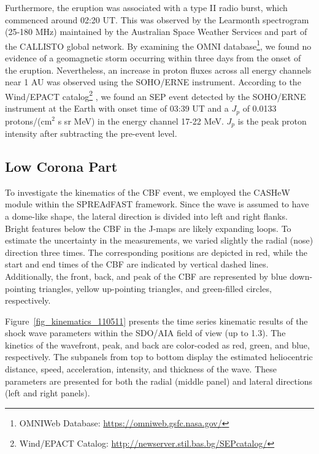 Furthermore, the eruption was associated with a type II radio burst, which commenced around 02:20 UT. This was observed by the Learmonth spectrogram (25-180 MHz) maintained by the Australian Space Weather Services and part of the CALLISTO global network. By examining the OMNI database\footnote{OMNIWeb Database: \url{https://omniweb.gsfc.nasa.gov/}}, we found no evidence of a geomagnetic storm occurring within three days from the onset of the eruption. Nevertheless, an increase in proton fluxes across all energy channels near 1 AU was observed using the SOHO/ERNE instrument. According to the Wind/EPACT catalog\footnote{Wind/EPACT Catalog: \url{http://newserver.stil.bas.bg/SEPcatalog/}} \citep{miteva_2016, miteva_2017}, we found an SEP event detected by the SOHO/ERNE instrument at the Earth with onset time of 03:39 UT and a $J_p$ of 0.0133 protons/(cm$^2$ s sr MeV) in the energy channel 17-22 MeV. $J_p$ is the peak proton intensity after subtracting the pre-event level.

\subsection{Low Corona Part}
To investigate the kinematics of the CBF event, we employed the CASHeW module within the SPREAdFAST framework. Since the wave is assumed to have a dome-like shape, the lateral direction is divided into left and right flanks. Bright features below the CBF in the J-maps are likely expanding loops. To estimate the uncertainty in the measurements, we varied slightly the radial (nose) direction three times. The corresponding positions are depicted in red, while the start and end times of the CBF are indicated by vertical dashed lines. Additionally, the front, back, and peak of the CBF are represented by blue down-pointing triangles, yellow up-pointing triangles, and green-filled circles, respectively.

Figure~\ref{fig_kinematics_110511} presents the time series kinematic results of the shock wave parameters within the SDO/AIA field of view (up to 1.3\rsun). The kinetics of the wavefront, peak, and back are color-coded as red, green, and blue, respectively. The subpanels from top to bottom display the estimated heliocentric distance, speed, acceleration, intensity, and thickness of the wave. These parameters are presented for both the radial (middle panel) and lateral directions (left and right panels).

